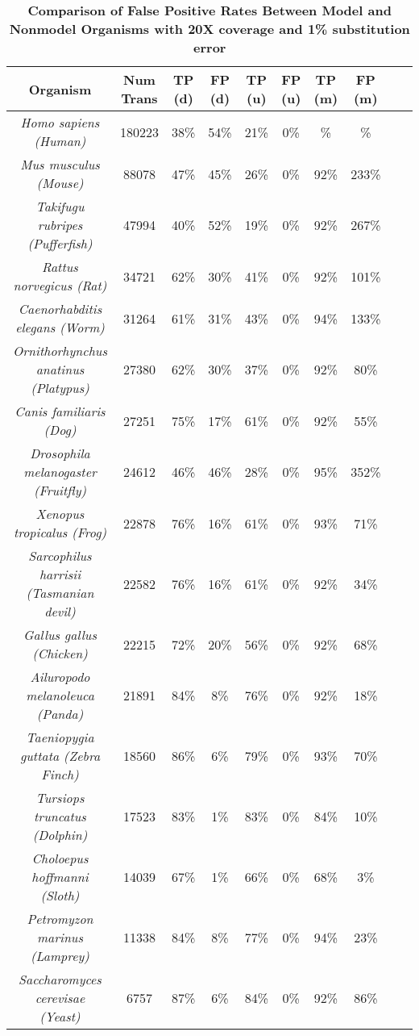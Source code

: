 \documentclass[10pt]{article}
\begin{document}
\begin{table}[!ht]
\caption{
\bf{Comparison of False Positive Rates Between Model and Nonmodel Organisms with 20X coverage and 1\% substitution error}}
\begin{tabular}{|c|c||c|c||c|c||c|c||c|c|}
\hline
Organism & Num Trans & TP (d) & FP (d) & TP (u) & FP (u) & TP (m) & FP (m)\\
\hline
\it{Homo sapiens} (Human) & 180223 & 38\%& 54\%& 21\% & 0\%&\%&\%\\
\it{Mus musculus} (Mouse) & 88078 & 47\%& 45\%& 26\% & 0\%& 92\%& 233\%\\
\it{Takifugu rubripes} (Pufferfish) & 47994 & 40\%& 52\%& 19\% & 0\%& 92\%& 267\%\\
\it{Rattus norvegicus} (Rat) & 34721 &  62\%& 30\%& 41\% & 0\%& 92\%& 101\%\\
\it{Caenorhabditis elegans} (Worm) & 31264 &  61\%& 31\%& 43\% & 0\%& 94\%&133\%\\
\it{Ornithorhynchus anatinus} (Platypus) & 27380 & 62\%& 30\%& 37\% & 0\%&92\%&80\%\\
\it{Canis familiaris} (Dog) & 27251 &  75\%& 17\%& 61\% & 0\%& 92\% & 55\%\\
\it{Drosophila melanogaster} (Fruitfly) & 24612 & 46\%& 46\%& 28\% & 0\%& 95\%& 352\%\\
\it{Xenopus tropicalus} (Frog) & 22878 &  76\%& 16\%& 61\% & 0\%& 93\%& 71\%\\
\it{Sarcophilus harrisii} (Tasmanian devil) & 22582 & 76\%& 16\%& 61\% & 0\%& 92\%& 34\%\\
\it{Gallus gallus} (Chicken) & 22215 & 72\%& 20\%& 56\% & 0\%& 92\%& 68\%\\
\it{Ailuropodo melanoleuca} (Panda) & 21891 &  84\%& 8\%& 76\% & 0\%& 92\%& 18\%\\
\it{Taeniopygia guttata} (Zebra Finch) & 18560 & 86\%& 6\%& 79\% & 0\%& 93\%& 70\%\\
\it{Tursiops truncatus} (Dolphin) & 17523 &  83\%& 1\%& 83\% & 0\%& 84\%& 10\%\\
\it{Choloepus hoffmanni} (Sloth) & 14039 &  67\%& 1\%& 66\% & 0\%& 68\%& 3\%\\
\it{Petromyzon marinus} (Lamprey) & 11338 &  84\%& 8\%& 77\% & 0\%&94\%&23\%\\
\it{Saccharomyces cerevisae} (Yeast) & 6757 & 87\%& 6\%& 84\% & 0\%& 92\%& 86\%\\

\hline
\end{tabular}
\begin{flushleft}\end{flushleft}
\label{tab:compModelNonmodelSpecies}
\end{table}
\end{document}
